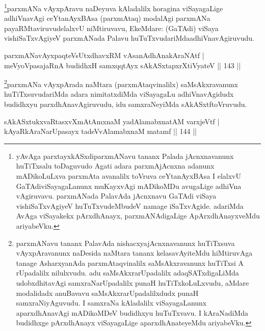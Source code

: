 \begin{artha}
\footnote{yAvAga parxtayxkASxdiparxmANavu tananx Palada jAcnxnavanunx huTiTxsalu toDaguvudo Agati adara parxmAjAcnxna adanunx mADikoLuLxva parxmAta avanalilx toVruva ceYtanAyxBAsa I elalxvU GaTAdiviSayagaLanunx muKayxvAgi mADikoMDu avugaLige adhiVna vAgiruvavu. parxmANada PalavAda jAcnxnavu GaTAdi viSaya vishiSaTxvAgiyeV huTuTxvudeMbudeV namage iSaTxvAgide. adariMda AvAga viSayakekx pArxdhAnayx, parxmANAdigaLige ApArxdhAnayxveMdu ariyabeVku.}parxmANa vAyxpAravu naDeyuva kAladalilx horagina viSayagaLige adhiVnavAgi ceYtanAyxBAsa (parxmAtaq) modalAgi parxmANa payaRMtaviruvudelalxvU niMtiruvavu, EkeMdare: (GaTAdi) viSaya vishiSaTxvAgiyeV parxmANada Palavu huTuTxvudariMda\break adhiVnavAgiruvudu.
\end{artha}


\begin{shl}
parxmANavAyxpaqteVsUtxdhavxRM vAsanAdhAnakAraNAtf |\\
meVyoVpasajaRnA budidhxH samxqqtAyx sAkASxtapxrXtiVyateV \hfill || 143 ||
\end{shl}

\begin{artha}
\footnote{parxmANavu tananx PalavAda nishacxyajAcnxnavanunx huTiTxsuva vAyxpAravanunx naDesida naMtara tananx kelasavAyiteMdu hiMtiruvAga tanage AsharxyanAda parxmAtaqvinalilx saMsAkxravanunx huTiTxsi A rUpadalilx nilulxvudu. adu saMsAkxrarUpadalilx adaqSATxdigaLiMda udobxdhitavAgi samxraNarUpadalilx punaH huTiTxkoLuLxvudu, aMdare modalidadx anuBavavu saMsAkxrarUpadalilxdudx punaH samxraNiyAguvudu. I samxraNa kAladalilx viSayagaLanunx aparxdhAnavAgi mADikoMDeV budidhxyu huTuTxvavu. I kAraNadiMda budidhxge pArxdhAnayx viSayagaLige aparxdhAnateyeMdu ariyabeVku.}parxmANa vAyxpArada naMtara (parxmAtaqvinalilx) saMsAkxravanunx huTiTxsuvudariMda adara nimitatxdiMda viSayagaLu adhiVnavAgidudx budidhxyu parxdhAnavAgiruvudu, idu samxraNeyiMda sAkASxtf\break toVruvudu.
\end{artha}


\begin{shl}
sAkASxtukxvaRtasxvXmAtAmxnaM yadAlamabxnatAM varxjeVtf |\\
kAyaRkAraNarUpasayx tadeVvA\s \s lamabxnaM matamf \hfill || 144 ||
\end{shl}

